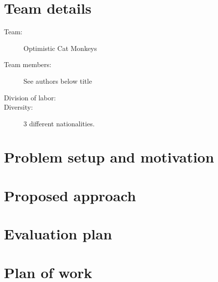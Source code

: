 \section{Team details}
\begin{description}
  \item[Team:] Optimistic Cat Monkeys
  \item[Team members:] See authors below title
  \item[Division of labor:] 
  \item[Diversity:] 3 different nationalities.
\end{description}

\section{Problem setup and motivation}

\section{Proposed approach}

\section{Evaluation plan}

\section{Plan of work}
